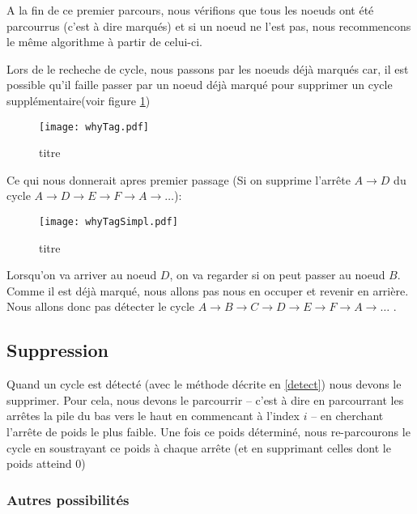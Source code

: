 \documentclass[12pt, oneside]{article}
\begin{document}
A la fin de ce premier parcours, nous vérifions que tous les noeuds ont été parcourrus (c'est à dire marqués) et si un noeud ne l'est pas, nous recommencons le même algorithme à partir de celui-ci.

Lors de le recheche de cycle, nous passons par les noeuds déjà marqués car, il est possible qu'il faille passer par un noeud déjà marqué pour supprimer un cycle supplémentaire(voir figure \ref{whyTag})

\begin{figure}[h]
   \caption{\label{whyTag} titre}
   \begin{center}
   \texttt{[image: whyTag.pdf]}
   \end{center}
\end{figure}

Ce qui nous donnerait apres premier passage (Si on supprime l'arrête $A \rightarrow D$ du cycle $A \rightarrow D \rightarrow E \rightarrow F \rightarrow A \rightarrow\ldots$):
\begin{figure}[h]
   \caption{\label{whyTagSimpl} titre}
   \begin{center}
   \texttt{[image: whyTagSimpl.pdf]}
   \end{center}
\end{figure}
Lorsqu'on va arriver au noeud $D$, on va regarder si on peut passer au noeud $B$. Comme il est déjà marqué, nous allons pas nous en occuper et revenir en arrière. Nous allons donc pas détecter le cycle $A \rightarrow B \rightarrow C \rightarrow D \rightarrow E \rightarrow F \rightarrow A \rightarrow\ldots$  .

\subsection{Suppression}
\label{del}

Quand un cycle est détecté (avec le méthode décrite en \ref{detect}) nous devons le supprimer. Pour cela, nous devons le parcourrir -- c'est à dire en parcourrant les arrêtes la pile du bas vers le haut en commencant à l'index $i$ -- en cherchant l'arrête de poids le plus faible. Une fois ce poids déterminé, nous re-parcourons le cycle en soustrayant ce poids à chaque arrête (et en supprimant celles dont le poids atteind 0)



\subsubsection{Autres possibilités}
\label{others}
\end{document}
